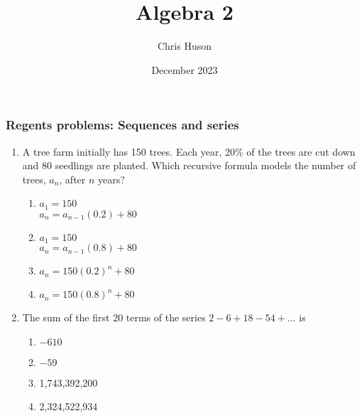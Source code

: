 \documentclass[12pt, twoside]{article}
\title{Algebra 2}
\author{Chris Huson}
\date{December 2023}
\begin{document}
\subsubsection*{Regents problems: Sequences and series}
\begin{enumerate}[itemsep=0.5cm]
\item A tree farm initially has 150 trees. Each year, 20\% of the trees are cut down and 80 seedlings are planted. Which recursive formula models the number of trees, $a_n$, after $n$ years? %
\begin{enumerate}
    \item $a_1 = 150$ \\ $a_n = a_{n-1}(0.2) + 80$
    \item $a_1 = 150$ \\ $a_n = a_{n-1}(0.8) + 80$
    \item $a_n = 150(0.2)^n + 80$
    \item $a_n = 150(0.8)^n + 80$
\end{enumerate}

\item The sum of the first 20 terms of the series \(2 - 6 + 18 - 54 + \ldots\) is %
\begin{enumerate}
    \item $-610$
    \item $-59$
    \item 1,743,392,200
    \item 2,324,522,934
\end{enumerate}


\end{enumerate}
\end{document}
